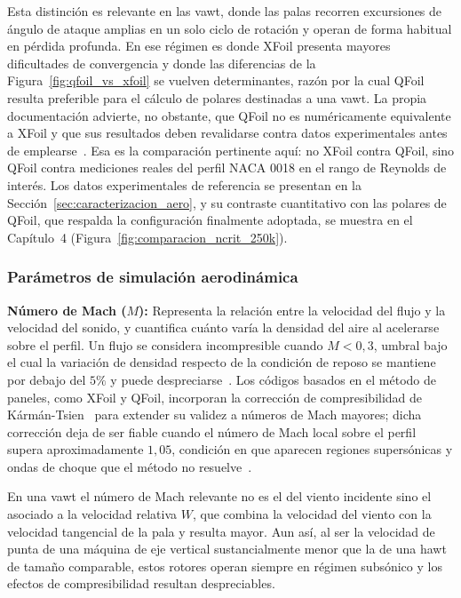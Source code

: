 Esta distinción es relevante en las \gls{vawt}, donde las palas recorren excursiones de ángulo de ataque amplias en un solo ciclo de rotación y operan de forma habitual en pérdida profunda. En ese régimen es donde XFoil presenta mayores dificultades de convergencia y donde las diferencias de la Figura~\ref{fig:qfoil_vs_xfoil} se vuelven determinantes, razón por la cual QFoil resulta preferible para el cálculo de polares destinadas a una \gls{vawt}. La propia documentación advierte, no obstante, que QFoil no es numéricamente equivalente a XFoil y que sus resultados deben revalidarse contra datos experimentales antes de emplearse~\parencite{QBladeDocsQFoil2024}. Esa es la comparación pertinente aquí: no XFoil contra QFoil, sino QFoil contra mediciones reales del perfil NACA 0018 en el rango de Reynolds de interés. Los datos experimentales de referencia se presentan en la Sección~\ref{sec:caracterizacion_aero}, y su contraste cuantitativo con las polares de QFoil, que respalda la configuración finalmente adoptada, se muestra en el Capítulo~4 (Figura~\ref{fig:comparacion_ncrit_250k}).

\subsubsection{Parámetros de simulación aerodinámica}

\textbf{Número de Mach ($M$):} Representa la relación entre la velocidad del flujo y la velocidad del sonido, y cuantifica cuánto varía la densidad del aire al acelerarse sobre el perfil. Un flujo se considera incompresible cuando $M < 0{,}3$, umbral bajo el cual la variación de densidad respecto de la condición de reposo se mantiene por debajo del $5\%$ y puede despreciarse~\parencite{Anderson2016}. Los códigos basados en el método de paneles, como XFoil y QFoil, incorporan la corrección de compresibilidad de Kármán-Tsien~\parencite{Karman1941,Tsien1939} para extender su validez a números de Mach mayores; dicha corrección deja de ser fiable cuando el número de Mach local sobre el perfil supera aproximadamente $1{,}05$, condición en que aparecen regiones supersónicas y ondas de choque que el método no resuelve~\parencite{drelaXfoil699}.

En una \gls{vawt} el número de Mach relevante no es el del viento incidente sino el asociado a la velocidad relativa $W$, que combina la velocidad del viento con la velocidad tangencial de la pala y resulta mayor. Aun así, al ser la velocidad de punta de una máquina de eje vertical sustancialmente menor que la de una \gls{hawt} de tamaño comparable, estos rotores operan siempre en régimen subsónico y los efectos de compresibilidad resultan despreciables.

